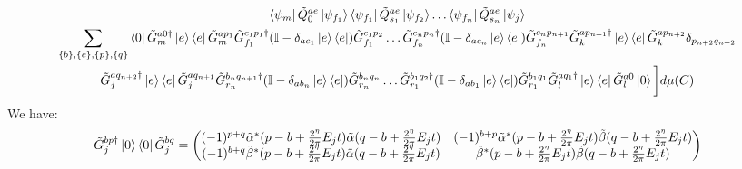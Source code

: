 \documentclass[aps,floatfix,10pt,amssymb,amsfont,amsmath,superscriptaddress,float,nofootinbib,longbibliography,nobalancelastpage,twocolumn]{revtex4-2}
\begin{document}
\begin{widetext}
\begin{multline}
\bra{\psi_m}\tilde Q^{ae}_0\ket{\psi_{f_1}}\bra{\psi_{f_1}}\tilde Q^{ae}_{s_1}\ket{\psi_{f_2}}\ldots \bra{\psi_{f_{n}}}\tilde Q^{ae}_{s_n}\ket{\psi_j}\\
\sum_{\{b\}, \{c\}, \{p\}, \{q\}}
\bra{0}\tilde G^{a0\dagger}_m\ket{e}\bra{e}\tilde G^{ap_1}_m\tilde G^{c_1p_1\dagger}_{f_1}(\mathbb{I} - \delta_{ac_1}\ket{e}\bra{e})\tilde G^{c_1p_2}_{f_1}\ldots \tilde G^{c_np_n\dagger}_{f_n}(\mathbb{I} - \delta_{ac_n}\ket{e}\bra{e})\tilde G^{c_np_{n+1}}_{f_n}\tilde G^{ap_{n+1}\dagger}_{k}\ket{e}\bra{e}\tilde G^{ap_{n+2}}_k \delta_{p_{n+2}q_{n+2}}\\\tilde G^{aq_{n+2}\dagger}_j \ket{e}\bra{e}\tilde G^{aq_{n+1}}_j \tilde G^{b_{n}q_{n+1}\dagger}_{r_n}(\mathbb{I} - \delta_{ab_n}\ket{e}\bra{e})\tilde G^{b_nq_n}_{r_n}\ldots \tilde G^{b_1q_2\dagger}_{r_1}(\mathbb{I} - \delta_{ab_1}\ket{e}\bra{e})\tilde G^{b_1q_1}_{r_1}\tilde G^{aq_1\dagger}_l\ket{e}\bra{e}\tilde G^{a0}_l\ket{0}\bigg]d\mu(C)
\end{multline}
We have:
\begin{equation}
    \tilde G^{bp\dagger}_{j}\ket{0}\bra{0} \tilde G^{bq}_{j} = \begin{pmatrix}
        (-1)^{p+q}\tilde \alpha^*(p-b+\frac{2^{\eta}}{2\pi}E_{j}t)\tilde  \alpha(q-b+\frac{2^{\eta}}{2\pi}E_{j}t) &(-1)^{b+p}\tilde  \alpha^*(p-b+\frac{2^{\eta}}{2\pi}E_{j}t)\tilde  \beta(q-b+\frac{2^{\eta}}{2\pi}E_{j}t)  \\(-1)^{b+q}\tilde  \beta^*(p-b+\frac{2^{\eta}}{2\pi}E_{j}t)\tilde  \alpha(q-b+\frac{2^{\eta}}{2\pi}E_{j}t) & \tilde  \beta^*(p-b+\frac{2^{\eta}}{2\pi}E_{j}t)\tilde  \beta(q-b+\frac{2^{\eta}}{2\pi}E_{j}t)

\end{pmatrix}
\end{equation}
\end{widetext}
\end{document}
